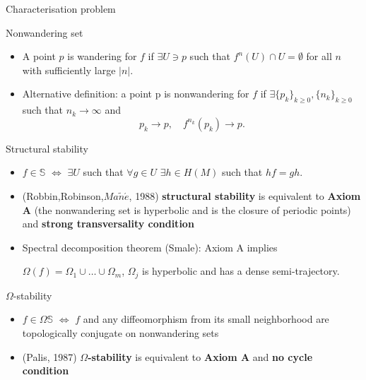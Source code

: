 \documentclass{beamer}
\begin{document}
\begin{section}{Characterisation problem}
\begin{frame}{Nonwandering set}
\begin{itemize}
	 \item A point $p$ is wandering for $f$ if $\exists U\ni p$ such that $f^{n}(U)\cap U =\emptyset$ for all $n$ with sufficiently large $|n|$.  
   \item Alternative definition: a point p is nonwandering for $f$ if
   $\exists\{p_k\}_{k\geq0},\{n_k\}_{k\geq0}$ such that $n_k\rightarrow\infty$ and
   $$p_k\rightarrow p,\quad f^{n_k}(p_k)\rightarrow p.$$
\end{itemize}
\end{frame}
\begin{frame}{Structural stability}
\begin{itemize}
	\item $f\in\mathbb{S}$ $\Leftrightarrow$ %
	$\exists U$ such that $\forall g\in U$ $\exists h\in H(M)$ such that $hf=gh$. 
	\item (Robbin,Robinson,$Ma\tilde{n}\acute{e}$, 1988) \textbf{structural stability} is equivalent to \textbf{Axiom A}
	(the nonwandering set is hyperbolic and is the closure of periodic points)
	 and \textbf{strong transversality condition}
	 \item 	Spectral decomposition theorem (Smale): Axiom A implies
	
	$\Omega(f)=\Omega_1\cup\ldots\cup\Omega_m$, $\Omega_j$ is hyperbolic and has a dense semi-trajectory.

\end{itemize}
\end{frame}	 
\begin{frame}{$\Omega$-stability}
\begin{itemize}
  \item $f\in\Omega\mathbb{S}$ $\Leftrightarrow$ $f$ and any diffeomorphism from its small neighborhood are topologically conjugate on nonwandering sets
  \item (Palis, 1987) $\Omega$\textbf{-stability} is equivalent to \textbf{Axiom A} and \textbf{no cycle condition} 
  

\end{itemize}
\end{frame}
\end{section}
\end{document}
